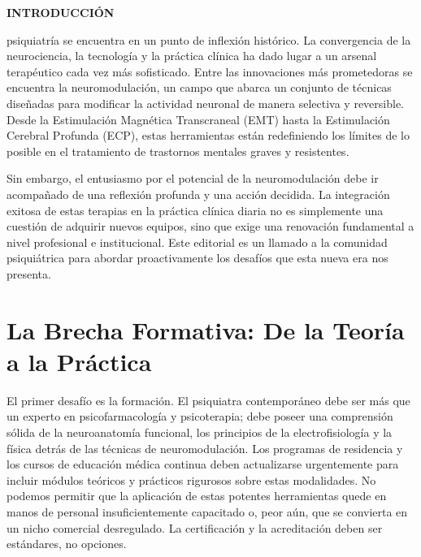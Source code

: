 \documentclass{apm-editorial}
\begin{document}
\makeAPMeditorial
{}


{\noindent\fontsize{9.5}{12}\selectfont\bfseries\color{burg}INTRODUCCI\'ON}\par
\vspace{4pt}
psiquiatr\'ia se encuentra en un punto de inflexi\'on hist\'orico.
La convergencia de la neurociencia, la tecnolog\'ia y la pr\'actica
cl\'inica ha dado lugar a un arsenal terap\'eutico cada vez m\'as
sofisticado. Entre las innovaciones m\'as prometedoras se encuentra la
neuromodulaci\'on, un campo que abarca un conjunto de t\'ecnicas
dise\~nadas para modificar la actividad neuronal de manera selectiva y
reversible. Desde la Estimulaci\'on Magn\'etica Transcraneal (EMT)
hasta la Estimulaci\'on Cerebral Profunda (ECP), estas herramientas
est\'an redefiniendo los l\'imites de lo posible en el tratamiento de
trastornos mentales graves y resistentes.

Sin embargo, el entusiasmo por el potencial de la neuromodulaci\'on
debe ir acompa\~nado de una reflexi\'on profunda y una acci\'on
decidida. La integraci\'on exitosa de estas terapias en la pr\'actica
cl\'inica diaria no es simplemente una cuesti\'on de adquirir nuevos
equipos, sino que exige una renovaci\'on fundamental a nivel
profesional e institucional. Este editorial es un llamado a la
comunidad psiqui\'atrica para abordar proactivamente los desaf\'ios que
esta nueva era nos presenta.

\section*{La Brecha Formativa: De la Teor\'ia a la Pr\'actica}

El primer desaf\'io es la formaci\'on. El psiquiatra contempor\'aneo
debe ser m\'as que un experto en psicofarmacolog\'ia y psicoterapia;
debe poseer una comprensi\'on s\'olida de la neuroanatom\'ia funcional,
los principios de la electrofisiolog\'ia y la f\'isica detr\'as de las
t\'ecnicas de neuromodulaci\'on. Los programas de residencia y los
cursos de educaci\'on m\'edica continua deben actualizarse urgentemente
para incluir m\'odulos te\'oricos y pr\'acticos rigurosos sobre estas
modalidades. No podemos permitir que la aplicaci\'on de estas potentes
herramientas quede en manos de personal insuficientemente capacitado o,
peor a\'un, que se convierta en un nicho comercial desregulado. La
certificaci\'on y la acreditaci\'on deben ser est\'andares, no opciones.
\end{document}
